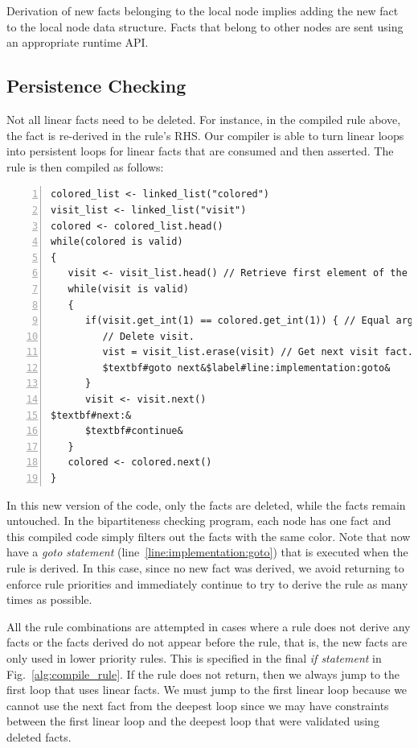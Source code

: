 Derivation of new facts belonging to the local node implies adding the new fact
to the local node data structure. Facts that belong to other nodes are sent
using an appropriate runtime API.

\subsection{Persistence Checking}

Not all linear facts need to be deleted. For instance, in the compiled rule
above, the fact  is re-derived in the rule's RHS.  Our
compiler is able to turn linear loops into persistent loops for linear facts
that are consumed and then asserted. The rule is then compiled as follows:

\begin{Verbatim}[numbers=left,fontsize=\codesize,commandchars=\$\#\&]
colored_list <- linked_list("colored")
visit_list <- linked_list("visit")
colored <- colored_list.head()
while(colored is valid)
{
   visit <- visit_list.head() // Retrieve first element of the list.
   while(visit is valid)
   {
      if(visit.get_int(1) == colored.get_int(1)) { // Equal arguments?
         // Delete visit.
         vist = visit_list.erase(visit) // Get next visit fact.
         $textbf#goto next&$label#line:implementation:goto&
      }
      visit <- visit.next()
$textbf#next:&
      $textbf#continue&
   }
   colored <- colored.next()
}
\end{Verbatim}

In this new version of the code, only the  facts are deleted, while
the  facts remain untouched. In the bipartiteness checking
program, each node has one  fact and this compiled code simply
filters out the  facts with the same color.  Note that now have a
\emph{goto statement} (line~\ref{line:implementation:goto}) that is executed
when the rule is derived. In this case, since no new  fact was
derived, we avoid returning to enforce rule priorities and immediately continue
to try to derive the rule as many times as possible.

All the rule combinations are attempted in cases where a rule does not derive
any facts or the facts derived do not appear before the rule, that is, the new
facts are only used in lower priority rules. This is specified in the final
\emph{if statement} in Fig.~\ref{alg:compile_rule}. If the rule does not return,
then we always jump to the first loop that uses linear facts. We must jump to
the first linear loop because we cannot use the next fact from the deepest loop
since we may have constraints between the first linear loop and the deepest loop
that were validated using deleted facts.

